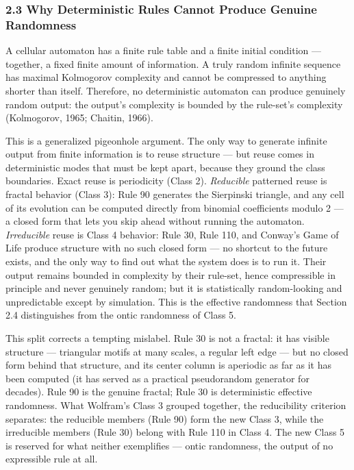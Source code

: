 \documentclass[
]{article}
\begin{document}
\hypertarget{why-deterministic-rules-cannot-produce-genuine-randomness}{%
\subsubsection{2.3 Why Deterministic Rules Cannot Produce Genuine
Randomness}\label{why-deterministic-rules-cannot-produce-genuine-randomness}}

A cellular automaton has a finite rule table and a finite initial
condition --- together, a fixed finite amount of information. A truly
random infinite sequence has maximal Kolmogorov complexity and cannot be
compressed to anything shorter than itself. Therefore, no deterministic
automaton can produce genuinely random output: the output's complexity
is bounded by the rule-set's complexity (Kolmogorov, 1965; Chaitin,
1966).

This is a generalized pigeonhole argument. The only way to generate
infinite output from finite information is to reuse structure --- but
reuse comes in deterministic modes that must be kept apart, because they
ground the class boundaries. Exact reuse is periodicity (Class 2).
\emph{Reducible} patterned reuse is fractal behavior (Class 3): Rule 90
generates the Sierpinski triangle, and any cell of its evolution can be
computed directly from binomial coefficients modulo 2 --- a closed form
that lets you skip ahead without running the automaton.
\emph{Irreducible} reuse is Class 4 behavior: Rule 30, Rule 110, and
Conway's Game of Life produce structure with no such closed form --- no
shortcut to the future exists, and the only way to find out what the
system does is to run it. Their output remains bounded in complexity by
their rule-set, hence compressible in principle and never genuinely
random; but it is statistically random-looking and unpredictable except
by simulation. This is the effective randomness that Section 2.4
distinguishes from the ontic randomness of Class 5.

This split corrects a tempting mislabel. Rule 30 is not a fractal: it
has visible structure --- triangular motifs at many scales, a regular
left edge --- but no closed form behind that structure, and its center
column is aperiodic as far as it has been computed (it has served as a
practical pseudorandom generator for decades). Rule 90 is the genuine
fractal; Rule 30 is deterministic effective randomness. What Wolfram's
Class 3 grouped together, the reducibility criterion separates: the
reducible members (Rule 90) form the new Class 3, while the irreducible
members (Rule 30) belong with Rule 110 in Class 4. The new Class 5 is
reserved for what neither exemplifies --- ontic randomness, the output
of no expressible rule at all.
\end{document}
